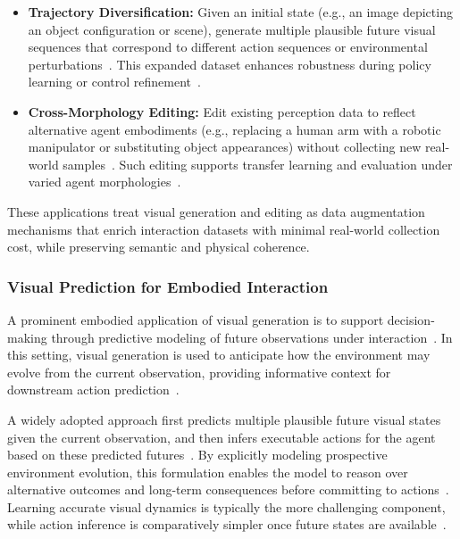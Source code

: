 \begin{itemize}
    \item \textbf{Trajectory Diversification:} Given an initial state (e.g., an image depicting an object configuration or scene), generate multiple plausible future visual sequences that correspond to different action sequences or environmental perturbations~\citep{zhu2024irasim,fu2025robomaster,zhou2024robodreamer,barcellona2024dreamtomanipulate}. This expanded dataset enhances robustness during policy learning or control refinement~\citep{zhu2024irasim,zhou2024robodreamer}.
    
    \item \textbf{Cross-Morphology Editing:} Edit existing perception data to reflect alternative agent embodiments (e.g., replacing a human arm with a robotic manipulator or substituting object appearances) without collecting new real-world samples~\citep{chen2024roviaug,lepert2025phantom,li2025h2r,lepert2025masquerade,fan2026robopaint,song2025mitty}. Such editing supports transfer learning and evaluation under varied agent morphologies~\citep{chen2024roviaug,li2025h2r}.
\end{itemize}

These applications treat visual generation and editing as data augmentation mechanisms that enrich interaction datasets with minimal real-world collection cost, while preserving semantic and physical coherence.

\subsubsection{Visual Prediction for Embodied Interaction}

A prominent embodied application of visual generation is to support decision-making through predictive modeling of future observations under interaction~\citep{zhu2024irasim,hu2024vpp,li2025uva,zhu2025uwm}. In this setting, visual generation is used to anticipate how the environment may evolve from the current observation, providing informative context for downstream action prediction~\citep{zhu2024irasim,hu2024vpp}.

A widely adopted approach first predicts multiple plausible future visual states given the current observation, and then infers executable actions for the agent based on these predicted futures~\citep{zhao2025cotvla,tian2024predictive,du2023unipi,ko2024actionlessvideos,chen2025largevideoplanner}. By explicitly modeling prospective environment evolution, this formulation enables the model to reason over alternative outcomes and long-term consequences before committing to actions~\citep{du2023unipi,chen2025largevideoplanner,zhou2024robodreamer}. Learning accurate visual dynamics is typically the more challenging component, while action inference is comparatively simpler once future states are available~\citep{zhu2024irasim,tian2024predictive,hu2024vpp}.

